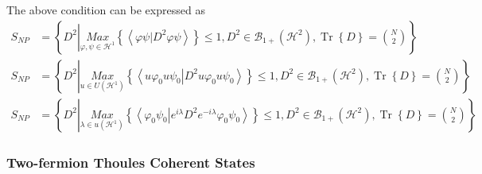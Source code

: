 \documentclass[aps,preprint]{revtex4}%
\begin{document}
The above condition can be expressed as
\begin{align}
S_{NP} &  =\left\{  D^{2}\left\vert \underset{\varphi,\psi\in\mathcal{H}%
^{1}}{Max}\left\{  \left\langle \left.  \varphi\psi\right\vert D^{2}%
\varphi\psi\right\rangle \right\}  \leq1,D^{2}\in\mathcal{B}_{1+}\left(
\mathcal{H}^{2}\right)  ,\operatorname*{Tr}\left\{  D\right\}  =\binom{N}%
{2}\right.  \right\}  \nonumber\\
S_{NP} &  =\left\{  D^{2}\left\vert \underset{u\in U\left(  \mathcal{H}%
^{1}\right)  }{Max}\left\{  \left\langle \left.  u\varphi_{0}u\psi
_{0}\right\vert D^{2}u\varphi_{0}u\psi_{0}\right\rangle \right\}  \leq
1,D^{2}\in\mathcal{B}_{1+}\left(  \mathcal{H}^{2}\right)  ,\operatorname*{Tr}%
\left\{  D\right\}  =\binom{N}{2}\right.  \right\}  \nonumber\\
S_{NP} &  =\left\{  D^{2}\left\vert \underset{\lambda\in u\left(
\mathcal{H}^{1}\right)  }{Max}\left\{  \left\langle \left.  \varphi_{0}%
\psi_{0}\right\vert e^{i\lambda}D^{2}e^{-i\lambda}\varphi_{0}\psi
_{0}\right\rangle \right\}  \leq1,D^{2}\in\mathcal{B}_{1+}\left(
\mathcal{H}^{2}\right)  ,\operatorname*{Tr}\left\{  D\right\}  =\binom{N}%
{2}\right.  \right\}
\end{align}


\subsubsection{Two-fermion Thoules Coherent States}
\end{document}
